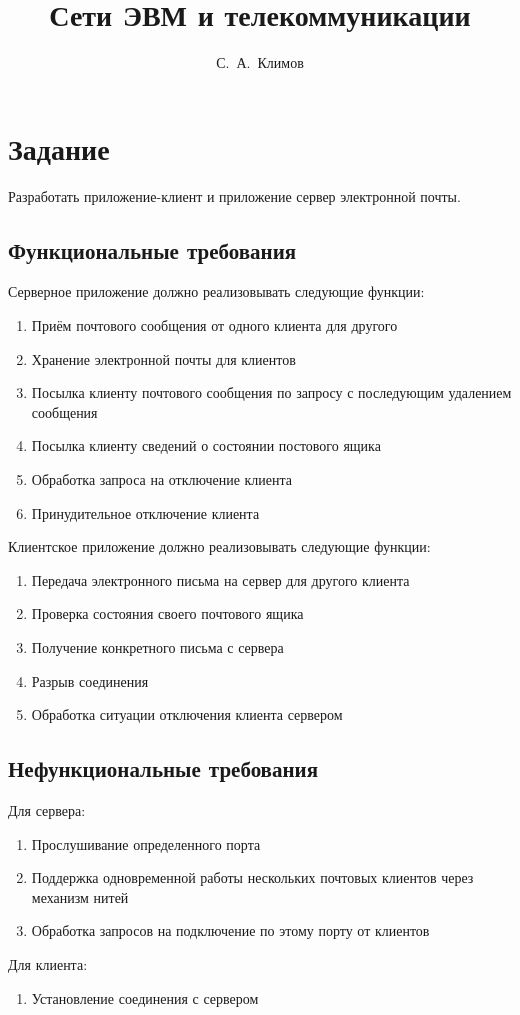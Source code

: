 \documentclass[12pt,a4paper]{report}
\author{С.~А.~Климов}
\title{Сети ЭВМ и телекоммуникации}
\begin{document}
\maketitle
\chapter{Задание}
Разработать приложение-клиент и приложение сервер электронной почты.
\section{Функциональные требования}
Серверное приложение должно реализовывать следующие функции:
\begin{enumerate}
\item Приём почтового сообщения от одного клиента для другого
\item Хранение электронной почты для клиентов
\item Посылка клиенту почтового сообщения по запросу с последующим
удалением сообщения
\item Посылка клиенту сведений о состоянии постового ящика
\item Обработка запроса на отключение клиента
\item Принудительное отключение клиента
\end{enumerate}
Клиентское приложение должно реализовывать следующие функции:
\begin{enumerate}
\item Передача электронного письма на сервер для другого клиента
\item Проверка состояния своего почтового ящика
\item Получение конкретного письма с сервера
\item Разрыв соединения
\item Обработка ситуации отключения клиента сервером
\end{enumerate}
\section{Нефункциональные требования}
Для сервера:
\begin{enumerate}
\item Прослушивание определенного порта
\item Поддержка одновременной работы нескольких почтовых клиентов
через механизм нитей
\item Обработка запросов на подключение по этому порту от клиентов
\end{enumerate}
Для клиента:
\begin{enumerate}
\item Установление соединения с сервером
\end{enumerate}
\end{document}
